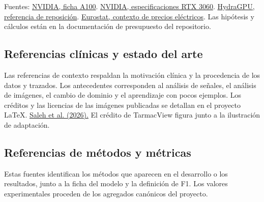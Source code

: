 \documentclass[11pt,a4paper]{article}
\begin{document}
Fuentes: \href{https://www.nvidia.com/content/dam/en-zz/Solutions/Data-Center/a100/pdf/nvidia-a100-datasheet-us-nvidia-1758950-r4-web.pdf}{NVIDIA, ficha A100}. \href{https://www.nvidia.com/en-au/geforce/graphics-cards/30-series/rtx-3060-3060ti/}{NVIDIA, especificaciones RTX 3060}. \href{https://www.hydragpu.com/nvidia-a100-80gb-refurbished.html}{HydraGPU, referencia de reposición}. \href{https://ec.europa.eu/eurostat/statistics-explained/index.php?title=Electricity_price_statistics}{Eurostat, contexto de precios eléctricos}. Las hipótesis y cálculos están en la documentación de presupuesto del repositorio.

\subsection*{Referencias clínicas y estado del arte}
Las referencias de contexto respaldan la motivación clínica y la procedencia de los datos y trazados. Los antecedentes corresponden al análisis de señales, el análisis de imágenes, el cambio de dominio y el aprendizaje con pocos ejemplos. Los créditos y las licencias de las imágenes publicadas se detallan en el proyecto LaTeX. \href{https://doi.org/10.1371/journal.pdig.0001222}{Saleh et al. (2026).} El crédito de TarmacView figura junto a la ilustración de adaptación.

\subsection*{Referencias de métodos y métricas}
Estas fuentes identifican los métodos que aparecen en el desarrollo o los resultados, junto a la ficha del modelo y la definición de F1. Los valores experimentales proceden de los agregados canónicos del proyecto.
\end{document}
